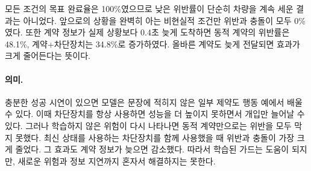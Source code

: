 모든 조건의 목표 완료율은 100\%였으므로 낮은 위반률이 단순히 차량을 계속 세운 결과는 아니었다. 앞으로의 상황을 완벽히 아는 비현실적 조건만 위반과 충돌이 모두 0\%였다. 또한 계약 정보가 실제 상황보다 0.4초 늦게 도착하면 동적 계약의 위반률은 48.1\%, 계약+차단장치는 34.8\%로 증가하였다. 올바른 계약도 늦게 전달되면 효과가 크게 줄어든다는 뜻이다.

\paragraph{의미.}
충분한 성공 시연이 있으면 모델은 문장에 적히지 않은 일부 제약도 행동 예에서 배울 수 있다. 이때 차단장치를 항상 사용하면 성능을 더 높이지 못하면서 개입만 늘어날 수 있다. 그러나 학습하지 않은 위험이 다시 나타나면 동적 계약만으로는 위반을 모두 막지 못했다. 최신 상태를 사용하는 차단장치를 함께 사용했을 때 위반과 충돌이 가장 크게 줄었다. 그 효과도 계약 정보가 늦으면 감소했다. 따라서 학습된 가드는 도움이 되지만, 새로운 위험과 정보 지연까지 혼자서 해결하지는 못한다.
